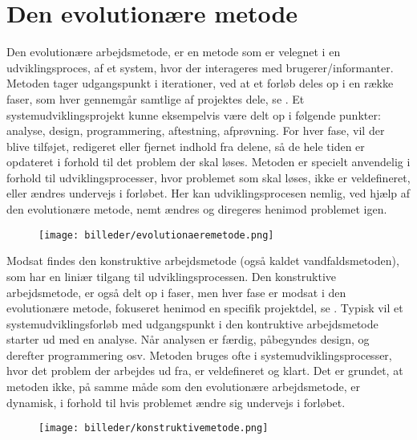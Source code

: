 \chapter{Den evolutionære metode}
\label{akademiskmetode}

Den evolutionære arbejdsmetode, er en metode som er velegnet i en udviklingsproces, af et system, hvor der interageres med brugerer/informanter. Metoden tager udgangspunkt i iterationer, ved at et forløb deles op i en række faser, som hver gennemgår samtlige af projektes dele, se . Et systemudviklingsprojekt kunne eksempelvis være delt op i følgende punkter: analyse, design, programmering, aftestning, afprøvning. For hver fase, vil der blive tilføjet, redigeret eller fjernet indhold fra delene, så de hele tiden er opdateret i forhold til det problem der skal løses. Metoden er specielt anvendelig i forhold til udviklingsprocesser, hvor problemet som skal løses, ikke er veldefineret, eller ændres undervejs i forløbet. Her kan udviklingsprocesen nemlig, ved hjælp af den evolutionære metode, nemt ændres og diregeres henimod problemet igen. 

\begin{figure}[h]
		\centering
		\texttt{[image: billeder/evolutionaeremetode.png]}
  		\label{fig:evolutionaeremetode}
\end{figure}

Modsat findes den konstruktive arbejdsmetode (også kaldet vandfaldsmetoden), som har en liniær tilgang til udviklingsprocessen. Den konstruktive arbejdsmetode, er også delt op i faser, men hver fase er modsat i den evolutionære metode, fokuseret henimod en specifik projektdel, se . Typisk vil et systemudviklingsforløb med udgangspunkt i den kontruktive arbejdsmetode starter ud med en analyse. Når analysen er færdig, påbegyndes design, og derefter programmering osv. Metoden bruges ofte i systemudviklingsprocesser, hvor det problem der arbejdes ud fra, er veldefineret og klart. Det er grundet, at metoden ikke, på samme måde som den evolutionære arbejdsmetode, er dynamisk, i forhold til hvis problemet ændre sig undervejs i forløbet.     

\begin{figure}[h]
		\centering
		\texttt{[image: billeder/konstruktivemetode.png]}
  		\label{fig:konstruktivemetode}
\end{figure}

